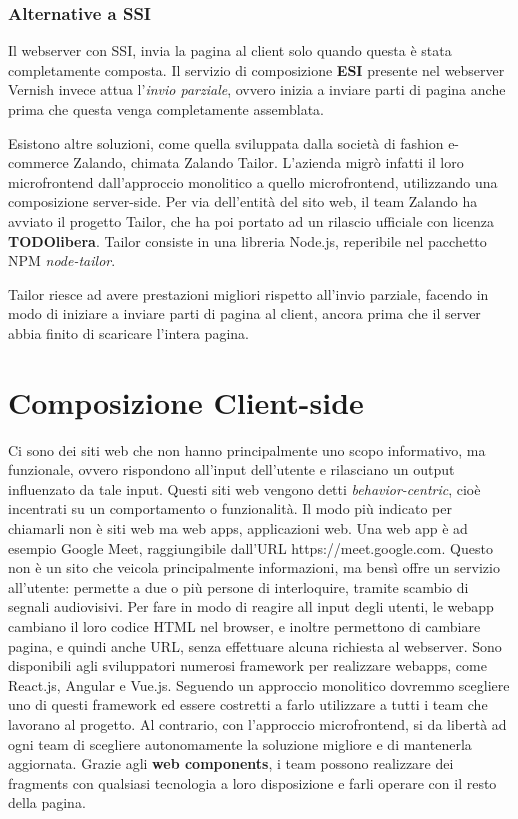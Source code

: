 \subsubsection*{Alternative a SSI}
Il webserver con SSI, invia la pagina al client solo quando questa è stata completamente composta.
Il servizio di composizione \textbf{ESI} presente nel webserver Vernish invece attua l'\emph{invio parziale},
 ovvero inizia a inviare parti di pagina anche prima che questa venga completamente assemblata.

Esistono altre soluzioni, come quella sviluppata dalla società di fashion e-commerce Zalando, chimata Zalando Tailor.
L'azienda migrò infatti il loro microfrontend dall'approccio monolitico a quello microfrontend, utilizzando una composizione
server-side. Per via dell'entità del sito web, il team Zalando ha avviato il progetto Tailor, che ha poi portato ad un rilascio 
ufficiale con licenza \textbf{TODOlibera}. Tailor consiste in una libreria Node.js, reperibile nel pacchetto NPM \emph{node-tailor}.

Tailor riesce ad avere prestazioni migliori rispetto all'invio parziale, facendo in modo di iniziare a inviare parti di pagina al client,
ancora prima che il server abbia finito di scaricare l'intera pagina.

\pagebreak
\section*{Composizione Client-side}
Ci sono dei siti web che non hanno principalmente uno scopo informativo, ma funzionale, ovvero rispondono all'input dell'utente
e rilasciano un output influenzato da tale input. Questi siti web vengono detti \emph{behavior-centric}, cioè 
incentrati su un comportamento o funzionalità.
Il modo più indicato per chiamarli non è siti web ma web apps, applicazioni web.
Una web app è ad esempio Google Meet, raggiungibile dall'URL https://meet.google.com.
Questo non è un sito che veicola principalmente informazioni, ma bensì offre un servizio all'utente: permette a due o più persone di 
interloquire, tramite scambio di segnali audiovisivi. Per fare in modo di reagire
all input degli utenti, le webapp cambiano il loro codice HTML nel browser, e inoltre permettono 
di cambiare pagina, e quindi anche URL, senza effettuare alcuna richiesta al webserver.
Sono disponibili agli sviluppatori numerosi framework per realizzare webapps, come React.js, Angular e Vue.js.
Seguendo un approccio monolitico dovremmo scegliere uno di questi framework ed essere costretti a farlo utilizzare
a tutti i team che lavorano al progetto. Al contrario, con l'approccio microfrontend, si da libertà ad ogni team
di scegliere autonomamente la soluzione migliore e di mantenerla aggiornata.
Grazie agli \textbf{web components}, i team possono realizzare dei fragments con qualsiasi tecnologia a loro disposizione e 
farli operare con il resto della pagina.



